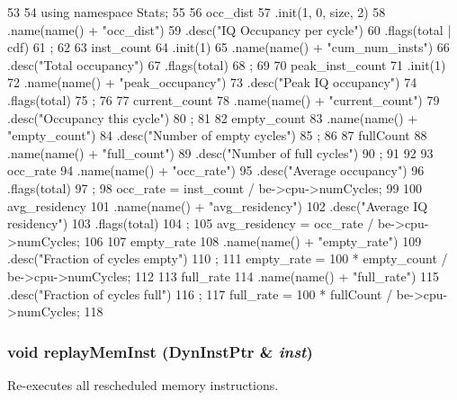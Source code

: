 \begin{DoxyCode}
53 {
54     using namespace Stats;
55 
56     occ_dist
57         .init(1, 0, size, 2)
58         .name(name() + "occ_dist")
59         .desc("IQ Occupancy per cycle")
60         .flags(total | cdf)
61         ;
62 
63     inst_count
64         .init(1)
65         .name(name() + "cum_num_insts")
66         .desc("Total occupancy")
67         .flags(total)
68         ;
69 
70     peak_inst_count
71         .init(1)
72         .name(name() + "peak_occupancy")
73         .desc("Peak IQ occupancy")
74         .flags(total)
75         ;
76 
77     current_count
78         .name(name() + "current_count")
79         .desc("Occupancy this cycle")
80         ;
81 
82     empty_count
83         .name(name() + "empty_count")
84         .desc("Number of empty cycles")
85         ;
86 
87     fullCount
88         .name(name() + "full_count")
89         .desc("Number of full cycles")
90         ;
91 
92 
93     occ_rate
94         .name(name() + "occ_rate")
95         .desc("Average occupancy")
96         .flags(total)
97         ;
98     occ_rate = inst_count / be->cpu->numCycles;
99 
100     avg_residency
101         .name(name() + "avg_residency")
102         .desc("Average IQ residency")
103         .flags(total)
104         ;
105     avg_residency = occ_rate / be->cpu->numCycles;
106 
107     empty_rate
108         .name(name() + "empty_rate")
109         .desc("Fraction of cycles empty")
110         ;
111     empty_rate = 100 * empty_count / be->cpu->numCycles;
112 
113     full_rate
114         .name(name() + "full_rate")
115         .desc("Fraction of cycles full")
116         ;
117     full_rate = 100 * fullCount / be->cpu->numCycles;
118 }
\end{DoxyCode}
\hypertarget{classBackEnd_1_1InstQueue_ae165df775b4de9e9430228c7f04c2bc9}{
\subsubsection[{replayMemInst}]{\setlength{\rightskip}{0pt plus 5cm}void replayMemInst ({\bf DynInstPtr} \& {\em inst})}}
\label{classBackEnd_1_1InstQueue_ae165df775b4de9e9430228c7f04c2bc9}
Re-\/executes all rescheduled memory instructions. 


